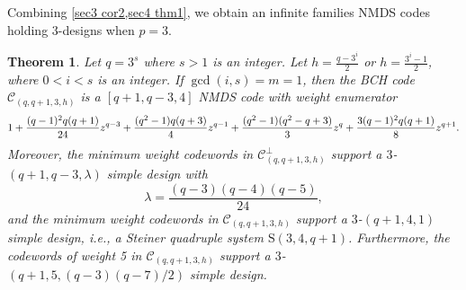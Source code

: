 \documentclass[sn-mathphys-num]{sn-jnl}%
\theoremstyle{thmstyleone}%
\newtheorem{theorem}{Theorem}%
\theoremstyle{thmstyletwo}%
\theoremstyle{thmstylethree}%
\begin{document}
Combining \cref{sec3 cor2,sec4 thm1}, we obtain an infinite families NMDS codes holding $3$-designs when $p=3$. 
\begin{theorem}
	\label{sec4 thm2}
	Let $q=3^s$ where $s>1$ is an integer. Let $h=\frac{q-3^i}{2}$ or $h=\frac{3^i-1}{2}$, where $0<i<s$ is an integer. If $\gcd(i,s)=m=1$, then the BCH code $\mathcal{C}_{(q,q+1,3,h)}$ is a $[q+1,q-3,4]$ NMDS code with weight enumerator
	\begin{equation*}
		1+\frac{(q-1)^2q(q+1)}{24}z^{q-3}+\frac{(q^2-1)q(q+3)}{4}z^{q-1}+\\\frac{(q^2-1)(q^2-q+3)}3z^q+\frac{3(q-1)^2q(q+1)}8z^{q+1}.
	\end{equation*}
	Moreover, the minimum weight codewords in $\mathcal{C}^\perp_{(q,q+1,3,h)}$ support a $3$-$(q+1,q-3,\lambda)$ simple design with
	\begin{equation*}
		\lambda=\frac{(q-3)(q-4)(q-5)}{24}, 
	\end{equation*}
	and the minimum weight codewords in $\mathcal{C}_{(q,q+1,3,h)}$ support a $3$-$(q+1,4,1)$ simple design, i.e., a Steiner quadruple system $\mathrm{S}(3,4,q+1)$. Furthermore, the codewords of weight 5 in $\mathcal{C}_{(q,q+1,3,h)}$ support a $3$-$(q+1,5,(q-3)(q-7)/2)$ simple design.
\end{theorem}
\end{document}
